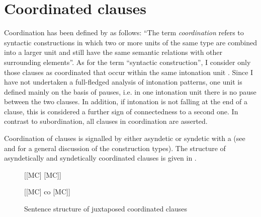 \section{Coordinated clauses}\label{sec:Coordination}
\largerpage[-2]
Coordination has been defined by \citet[34]{Haspelmath2004} as follows: “The term \textit{coordination} refers to syntactic constructions in which two or more units of the same type are combined into a larger unit and still have the same semantic relations with other surrounding elements”. As for the term “syntactic construction”, I consider only those clauses as coordinated that occur within the same intonation unit \citep[332]{Mithun1988}. Since I have not undertaken a full-fledged analysis of intonation patterns, one  unit is defined mainly on the basis of pauses, i.e. in one intonation unit there is no pause between the two clauses. In addition, if intonation is not falling at the end of a clause, this is considered a further sign of connectedness to a second one. In contrast to subordination, all clauses in coordination are asserted.

Coordination of clauses is signalled by either asyndetic  or syndetic  with a  (see  and  for a general discussion of the construction types). The structure of asyndetically and syndetically coordinated clauses is given in .

\begin{figure}


[[MC] [MC]]

[[MC] co [MC]]
\caption{Sentence structure of juxtaposed coordinated clauses}
\label{fig:CoordinationStructure}

\end{figure}

